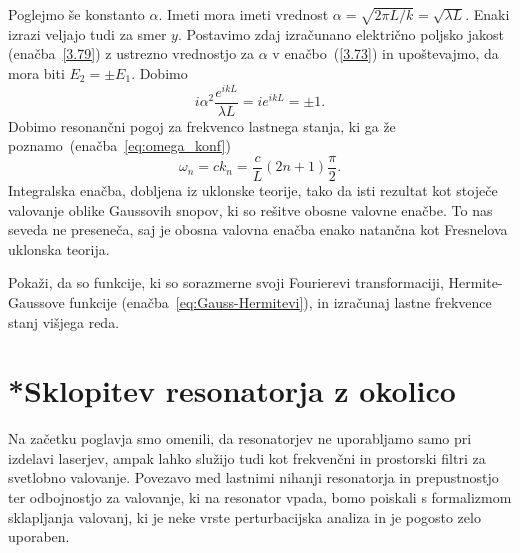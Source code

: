 Poglejmo še konstanto $\alpha$. Imeti mora imeti vrednost 
$\alpha = \sqrt{2\pi L/k}=\sqrt{\lambda L}$.
Enaki izrazi veljajo tudi za smer $y$. Postavimo zdaj izračunano električno 
poljsko jakost (enačba~\ref{3.79}) z ustrezno vrednostjo za $\alpha$ v 
enačbo~(\ref{3.73}) in upoštevajmo, da mora biti
$E_{2}=\pm E_{1}$. Dobimo 
\begin{equation}
i\alpha^{2}\frac{e^{ikL}}{\lambda L}=ie^{ikL}=\pm1.
\label{3.80}
\end{equation}
Dobimo resonančni pogoj za
frekvenco lastnega stanja, ki ga že poznamo~(enačba~\ref{eq:omega_konf})
\begin{equation}
\omega_{n}=ck_{n}=\frac{c}{L}(2n+1)\frac{\pi}{2}.
\label{3.81}
\end{equation}
Integralska enačba, dobljena iz uklonske teorije, tako da
isti rezultat kot stoječe valovanje oblike Gaussovih snopov, ki so
rešitve obosne valovne enačbe. To nas seveda ne preseneča, saj je
obosna valovna enačba enako natančna kot Fresnelova uklonska teorija.

\begin{definition}
Pokaži, da so funkcije, ki so sorazmerne svoji Fourierevi transformaciji, 
Hermite-Gaussove funkcije (enačba~\ref{eq:Gauss-Hermitevi}), in 
izračunaj lastne frekvence stanj višjega reda.
\end{definition}

\section{*Sklopitev resonatorja z okolico}
Na začetku poglavja smo omenili, da resonatorjev ne uporabljamo samo pri 
izdelavi laserjev, ampak lahko služijo tudi kot frekvenčni in
prostorski filtri za svetlobno valovanje. Povezavo med lastnimi nihanji
resonatorja in prepustnostjo ter odbojnostjo za valovanje, ki na resonator
vpada, bomo poiskali s formalizmom sklapljanja valovanj, 
ki je neke vrste perturbacijska analiza in je pogosto zelo uporaben.

